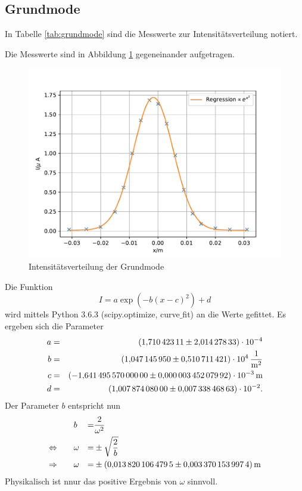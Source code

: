 \subsection{Grundmode}
In Tabelle \ref{tab:grundmode} sind die Messwerte zur Intensitätsverteilung notiert.

Die Messwerte sind in Abbildung \ref{fig:grundmode} gegeneinander aufgetragen.
\begin{figure}
  \centering
  \includegraphics[width=\textwidth]{grundmode.pdf}
  \caption{Intensitätsverteilung der Grundmode}
  \label{fig:grundmode}
\end{figure}
Die Funktion
\begin{equation*}
  I= a \exp{\left( -b(x-c)^2 \right)}+d
\end{equation*}
wird mittels Python 3.6.3 (scipy.optimize, curve$\_$fit) an die Werte gefittet.
Es ergeben sich die Parameter
\begin{align*}
a &=& \SI{ 1.71042311 \pm 2.01427833e-04  }{}\\
b &=& \SI{ 1.04714595 \pm 0.510711421  e+04}{\frac{1}{m^2}}\\
c &=& \SI{-1.64149557 \pm 0.00000345207992 e-03}{m}\\
d &=& \SI{ 1.00787408 \pm 0.00733846863 e-02}{}.\\
\end{align*}
Der Parameter $b$ entspricht nun
\begin{align*}
                  &&&&&      b &=&  \frac{2}{\omega^2} \\
  \Leftrightarrow &&&&& \omega &=& \pm \sqrt{\frac{2}{b}} \\
  \Rightarrow      &&&&& \omega &=& \pm \SI{0.0138201064795 \pm 0.0033701539974}{m}\\
\end{align*}
Physikalisch ist nnur das positive Ergebnis von $\omega$ sinnvoll.

